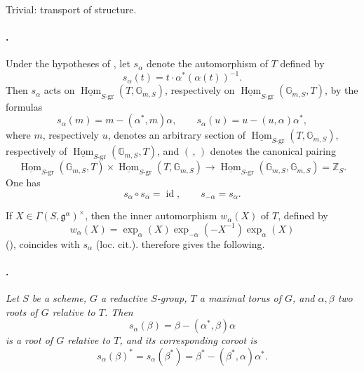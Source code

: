 \begin{center}
  
\end{center}

Trivial: transport of structure.

\paragraph{.}
Under the hypotheses of , let \(s_\alpha\) denote the
automorphism of \(T\) defined by
\[
  s_\alpha(t)=t\mathbin{\cdot}\alpha^*(\alpha(t))^{-1}.
\]
Then \(s_\alpha\) acts on
\(\underline{\operatorname{Hom}}_{S\text{-gr}}
(T,\mathbb G_{m,S})\), respectively on
\(\underline{\operatorname{Hom}}_{S\text{-gr}}
(\mathbb G_{m,S},T)\), by the formulas
\[
  s_\alpha(m)=m-(\alpha^*,m)\alpha,
  \qquad
  s_\alpha(u)=u-(u,\alpha)\alpha^*,
\]
where \(m\), respectively \(u\), denotes an arbitrary section of
\(\underline{\operatorname{Hom}}_{S\text{-gr}}(T,\mathbb G_{m,S})\),
respectively of
\(\underline{\operatorname{Hom}}_{S\text{-gr}}(\mathbb G_{m,S},T)\),
and \((\, ,\,)\) denotes the canonical pairing
\[
  \underline{\operatorname{Hom}}_{S\text{-gr}}
    (\mathbb G_{m,S},T)
  \times
  \underline{\operatorname{Hom}}_{S\text{-gr}}
    (T,\mathbb G_{m,S})
  \longrightarrow
  \underline{\operatorname{Hom}}_{S\text{-gr}}
    (\mathbb G_{m,S},\mathbb G_{m,S})
  =\mathbb Z_S.
\]
One has
\[
  s_\alpha\circ s_\alpha=\operatorname{id},
  \qquad
  s_{-\alpha}=s_\alpha.
\]

If
\(X\in\Gamma(S,\mathfrak g^\alpha)^\times\), then the inner
automorphism \(w_\alpha(X)\) of \(T\), defined by
\[
  w_\alpha(X)
  =
  \exp_\alpha(X)\exp_{-\alpha}(-X^{-1})\exp_\alpha(X)
\]
(), coincides with \(s_\alpha\) (loc. cit.).
 therefore gives the following.

\paragraph{.}
\textit{Let \(S\) be a scheme, \(G\) a reductive \(S\)-group, \(T\)
a maximal torus of \(G\), and \(\alpha,\beta\) two roots of \(G\)
relative to \(T\). Then}
\[
  s_\alpha(\beta)=\beta-(\alpha^*,\beta)\alpha
\]
\textit{is a root of \(G\) relative to \(T\), and its corresponding
coroot is}
\[
  s_\alpha(\beta)^*
  =
  s_\alpha(\beta^*)
  =
  \beta^*-(\beta^*,\alpha)\alpha^*.
\]

